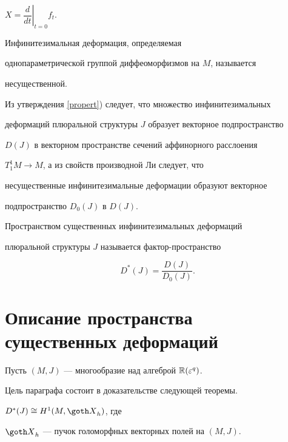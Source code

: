 $\left. X=\dfrac{d}{dt} \right|_{t=0} f_{t}$.


Инфинитезимальная деформация, определяемая


однопараметрической группой диффеоморфизмов на $M$, называется


несущественной.





Из утверждения \ref{propert}) следует, что множество инфинитезимальных


деформаций плюральной структуры $J$ образует векторное подпространство


$D(J)$ в векторном пространстве сечений аффинорного расслоения


$T_{1}^{1}M \to M$, а из свойств производной Ли следует, что


несущественные инфинитезимальные деформации образуют векторное


подпространство $D_{0}(J)$ в $D(J)$.





\begin{defn}


Пространством существенных инфинитезимальных деформаций


плюральной структуры $J$ называется фактор-пространство


$$


D^{*}(J)= \frac{D(J)}{D_{0}(J)}.


$$


\end{defn}





\section{Описание пространства существенных деформаций}





Пусть $(M,J)$ --- многообразие над алгеброй $\Bbb R(\varepsilon^q)$.


Цель параграфа состоит в доказательстве следующей теоремы.





\begin{thmnonum}


$D^{*}(J)\cong H^{1}(M,{\goth X}_{h})$, где


${\goth X}_{h}$ --- пучок голоморфных векторных полей на $(M,J)$.


\end{thmnonum}





